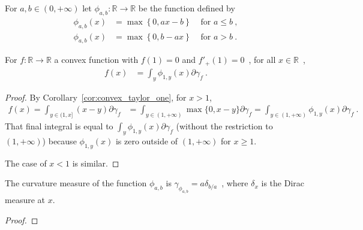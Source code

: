 \begin{definition}
  \label{def:statInfoFun}
  \leanok
  \uses{}
  For $a,b \in (0, +\infty)$ let $\phi_{a,b} : \mathbb{R} \to \mathbb{R}$ be the function defined by
  \begin{align*}
  \phi_{a,b}(x) &= \max\left\{0, a x - b \right\} & \text{ for } a \le b \: ,
  \\
  \phi_{a,b}(x) &= \max\left\{0, b - a x \right\} & \text{ for } a > b \: .
  \end{align*}
\end{definition}

\begin{corollary}
  \label{cor:convex_taylor_statInfoFun}
  \leanok
  For $f: \mathbb{R} \to \mathbb{R}$ a convex function with $f(1) = 0$ and $f'_+(1) = 0$~, for all $x \in \mathbb{R}$~,
  \begin{align*}
  f(x) &= \int_{y} \phi_{1,y}(x) \partial\gamma_f \: .
  \end{align*}
\end{corollary}

\begin{proof}\leanok
{}
By Corollary~\ref{cor:convex_taylor_one}, for $x > 1$,
\begin{align*}
f(x) = \int_{y \in (1, x]} (x - y) \partial\gamma_f
&= \int_{y \in (1, +\infty)} \max\{0, x - y\} \partial\gamma_f
= \int_{y \in (1, +\infty)} \phi_{1,y}(x) \partial\gamma_f
\: .
\end{align*}
That final integral is equal to $\int_y \phi_{1,y}(x) \partial\gamma_f$ (without the restriction to $(1, +\infty)$) because $\phi_{1,y}(x)$ is zero outside of $(1, +\infty)$ for $x \ge 1$.

The case of $x < 1$ is similar.
\end{proof}

\begin{lemma}
  \label{lem:curvatureMeasure_statInfoFun}
  The curvature measure of the function $\phi_{a,b}$ is $\gamma_{\phi_{a,b}} = a\delta_{b/a}$~, where $\delta_x$ is the Dirac measure at $x$.
\end{lemma}

\begin{proof}%
\uses{}

\end{proof}

